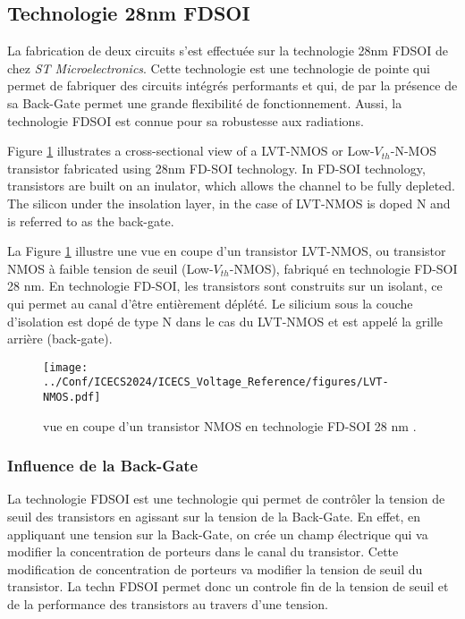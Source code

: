 \subsection{Technologie 28nm FDSOI}

La fabrication de deux circuits s'est effectuée sur la technologie 28nm FDSOI de chez  \textit{ST Microelectronics}. Cette technologie est une technologie de pointe qui permet de fabriquer des circuits intégrés performants et qui, de par la présence de sa Back-Gate permet une grande flexibilité de fonctionnement. Aussi, la technologie FDSOI est connue pour sa robustesse aux radiations.

Figure \ref{fig:coupeNMOS} illustrates a cross-sectional view of a LVT-NMOS or Low-$V_{th}$-N-MOS transistor fabricated using 28nm FD-SOI technology. In FD-SOI technology, transistors are built on an inulator, which allows the channel to be fully depleted. The silicon under the insolation layer, in the case of LVT-NMOS is doped N and is referred to as the back-gate.


La Figure \ref{fig:coupeNMOS} illustre une vue en coupe d'un transistor LVT-NMOS, ou transistor NMOS à faible tension de seuil (Low-$V_{th}$-NMOS), fabriqué en technologie FD-SOI 28 nm. En technologie FD-SOI, les transistors sont construits sur un isolant, ce qui permet au canal d’être entièrement déplété. Le silicium sous la couche d’isolation est dopé de type N dans le cas du LVT-NMOS et est appelé la grille arrière (back-gate).


\begin{figure}
    \centering
    \texttt{[image: ../Conf/ICECS2024/ICECS\_Voltage\_Reference/figures/LVT-NMOS.pdf]}
    \caption{vue en coupe d’un transistor NMOS en technologie FD-SOI 28 nm \cite{cathelin_fully_2017}.}
    \label{fig:coupeNMOS}
\end{figure}

\subsubsection{Influence de la Back-Gate} 
La technologie FDSOI est une technologie qui permet de contrôler la tension de seuil des transistors en agissant sur la tension de la Back-Gate.  En effet, en appliquant une tension sur la Back-Gate, on crée un champ électrique qui va modifier la concentration de porteurs dans le canal du transistor. Cette modification de concentration de porteurs va modifier la tension de seuil du transistor. La techn FDSOI permet donc un controle fin de la tension de seuil et de la performance des transistors au travers d'une tension.


